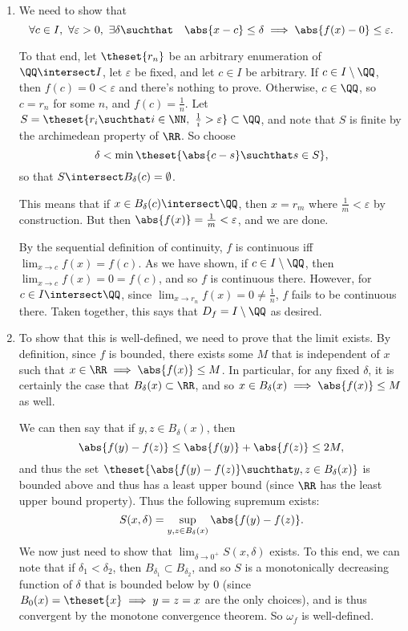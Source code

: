 \begin{solution}\hfill
\begin{enumerate}
  \item We need to show that
    $$
    \forall c\in I, ~\forall\varepsilon > 0, ~\exists \delta \suchthat \quad \abs{x-c} \leq \delta \implies \abs{f(x) - 0} \leq \varepsilon.
    $$

    To that end, let $\theset{r_n}$ be an arbitrary enumeration of $\QQ \intersect I$, let $\varepsilon$ be fixed, and let $c \in I$ be arbitrary. If $c\in I\setminus\QQ$, then $f(c) = 0 < \varepsilon$ and there's nothing to prove. Otherwise, $c\in\QQ$, so $c = r_n$ for some $n$, and $f(c) = \frac 1 n$. Let $S = \theset{r_i \suchthat i \in \NN,~ \frac 1 i > \varepsilon} \subset \QQ$, and note that $S$ is finite by the archimedean property of $\RR$. So choose
    $$
    \delta < \min\theset{\abs{c - s} \suchthat s\in S},
    $$
    so that $S \intersect B_\delta(c) = \emptyset$.

    This means that if $x\in B_\delta(c) \intersect \QQ$, then $x = r_m$ where $\frac 1 m < \varepsilon$ by construction. But then $\abs{f(x)} = \frac 1 m < \varepsilon$, and we are done.

    By the sequential definition of continuity, $f$ is continuous iff $\lim_{x\to c} f(x) = f(c)$. As we have shown, if $c\in I\setminus\QQ$, then $\lim_{x\to c}f(x) = 0 = f(c)$, and so $f$ is continuous there. However, for $c\in I\intersect \QQ$, since $\lim_{x\to r_n} f(x) = 0 \neq \frac 1 n$, $f$ fails to be continuous there. Taken together, this says that $D_f = I\setminus \QQ$ as desired.

  \item To show that this is well-defined, we need to prove that the limit exists. By definition, since $f$ is bounded, there exists some $M$ that is independent of $x$ such that $x\in \RR \implies \abs{f(x)} \leq M$. In particular, for any fixed $\delta$, it is certainly the case that $B_\delta(x) \subset \RR$, and so $x\in B_\delta(x) \implies \abs{f(x)} \leq M$ as well.

    We can then say that if $y,z \in B_\delta(x)$, then
    $$
    \abs{f(y) - f(z)} \leq \abs{f(y)} + \abs{f(z)} \leq 2M,
    $$
    and thus the set $\theset{\abs{f(y) - f(z)} \suchthat y,z \in B_\delta(x)}$ is bounded above and thus has a least upper bound (since $\RR$ has the least upper bound property). Thus the following supremum exists:
    $$
    S(x, \delta) = \sup_{y,z \in B_\delta(x)} \abs{f(y) - f(z)}.
    $$
    We now just need to show that $\lim_{\delta \to 0^+} S(x, \delta)$ exists. To this end, we can note that if $\delta_1 < \delta_2$, then $B_{\delta_1} \subset B_{\delta_2}$, and so $S$ is a monotonically decreasing function of $\delta$ that is bounded below by 0 (since $B_0(x) = \theset{x} \implies y=z=x$ are the only choices), and is thus convergent by the monotone convergence theorem. So $\omega_f$ is well-defined.


\end{enumerate}
\end{solution}
